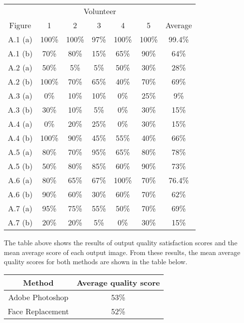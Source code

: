\vspace{0.2in}
\begin{center}
\begin{tabular}{|c|c|c|c|c|c||c|}
\hline
\multicolumn{7}{|c|}{Volunteer} \\
\cline{2-7}
Figure & 1 & 2 & 3 & 4 & 5 & Average\\
\hline
A.1 (a) & 100\% & 100\% & 97\% & 100\% & 100\% & 99.4\% \\
A.1 (b) & 70\% & 80\% & 15\% & 65\% & 90\% & 64\% \\
A.2 (a) & 50\% & 5\% & 5\% & 50\% & 30\% & 28\% \\
A.2 (b) & 100\% & 70\% & 65\% & 40\% & 70\% & 69\% \\
A.3 (a) & 0\% & 10\% & 10\% & 0\% & 25\% & 9\% \\
A.3 (b) & 30\% & 10\% & 5\% & 0\% & 30\% & 15\% \\
A.4 (a) & 0\% & 20\% & 25\% & 0\% & 30\% & 15\% \\
A.4 (b) & 100\% & 90\% & 45\% & 55\% & 40\% & 66\% \\
A.5 (a) & 80\% & 70\% & 95\% & 65\% & 80\% & 78\% \\
A.5 (b) & 50\% & 80\% & 85\% & 60\% & 90\% & 73\% \\
A.6 (a) & 80\% & 65\% & 67\% & 100\% & 70\% & 76.4\% \\
A.6 (b) & 90\% & 60\% & 30\% & 60\% & 70\% & 62\% \\
A.7 (a) & 95\% & 75\% & 55\% & 50\% & 70\% & 69\% \\
A.7 (b) & 20\% & 20\% & 5\% & 0\% & 30\% & 15\% \\
\hline
\end{tabular}
\end{center}

\vspace{0.2in}The table above shows the results of output quality satisfaction scores and the mean average score of each output image. From these results, the mean average quality scores for both methods are shown in the table below.
\vspace{0.2in}

\begin{center}
\begin{tabular}{|c|c|}
  \hline
  Method & Average quality score \\ \hline
  Adobe Photoshop & 53\% \\
  Face Replacement & 52\% \\
  \hline
\end{tabular}
\end{center} 